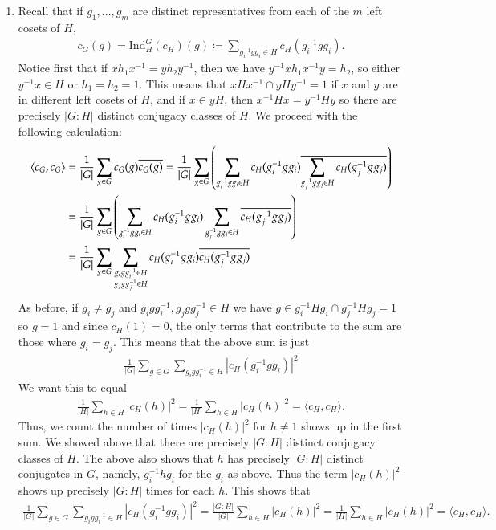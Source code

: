 \documentclass[12pt]{article}
\theoremstyle{definitionstyle}
\renewcommand{\ip}[1]{\langle#1\rangle}
\newcommand{\Ind}{\mathrm{Ind}}
\begin{document}
\begin{enumerate}
        \item Recall that if $g_1, \ldots, g_m$ are distinct representatives from each of the $m$ left cosets of $H$, 
        \begin{align*}
            c_G(g) = \Ind_H^G(c_H)(g) \coloneqq \sum_{g_i^{-1}gg_i \in H} c_H(g_i^{-1}gg_i).
        \end{align*} Notice first that if $xh_1x^{-1} = yh_2y^{-1}$, then we have $y^{-1}xh_1x^{-1}y = h_2$, so either $y^{-1}x \in H$ or $h_1 = h_2 = 1$. This means that $xHx^{-1} \cap yHy^{-1} = 1$ if $x$ and $y$ are in different left cosets of $H$, and if $x \in yH$, then $x^{-1}Hx = y^{-1}Hy$ so there are precisely $|G : H|$ distinct conjugacy classes of $H$. We proceed with the following calculation:
        \begin{align*}
            \ip{c_G, c_G} &= \frac{1}{|G|} \sum_{g \in G} c_G(g) \overline{c_G(g)} = \frac{1}{|G|} \sum_{g \in G} \qty(\sum_{g_i^{-1}gg_i \in H} c_H(g_i^{-1}gg_i) \overline{\sum_{g_j^{-1}gg_j \in H} c_H(g_j^{-1}gg_j)}) \\
            &= \frac{1}{|G|} \sum_{g \in G} \qty(\sum_{g_i^{-1}gg_i \in H} c_H(g_i^{-1}gg_i) \sum_{g_j^{-1}gg_j \in H} \overline{c_H(g_j^{-1}gg_j)}) \\
            &= \frac{1}{|G|} \sum_{g \in G} \sum_{\substack{g_igg_i^{-1} \in H \\ g_jgg_j^{-1} \in H}} c_H(g_i^{-1}gg_i) \overline{c_H(g_j^{-1}gg_j)} \\
        \end{align*}
        As before, if $g_i \neq g_j$ and $g_igg_i^{-1}, g_jgg_j^{-1} \in H$ we have $g \in g_i^{-1}Hg_i \cap g_j^{-1}Hg_j = 1$ so $g = 1$ and since $c_H(1) = 0$, the only terms that contribute to the sum are those where $g_i = g_j$. This means that the above sum is just
        \begin{align*}
            \frac{1}{|G|} \sum_{g \in G} \sum_{g_igg_i^{-1} \in H} |c_H(g_i^{-1}gg_i)|^2
        \end{align*}
        We want this to equal 
        \begin{align*}
            \frac{1}{|H|} \sum_{h \in H} |c_H(h)|^2 = \frac{1}{|H|} \sum_{h \in H} |c_H(h)|^2 = \ip{c_H, c_H}.
        \end{align*}
        Thus, we count the number of times $|c_H(h)|^2$ for $h \neq 1$ shows up in the first sum. We showed above that there are precisely $|G : H|$ distinct conjugacy classes of $H$. The above also shows that $h$ has precisely $|G : H|$ distinct conjugates in $G$, namely, $g_i^{-1}hg_i$ for the $g_i$ as above. Thus the term $|c_H(h)|^2$ shows up precisely $|G : H|$ times for each $h$. This shows that
        \begin{align*}
            \frac{1}{|G|} \sum_{g \in G} \sum_{g_igg_i^{-1} \in H} |c_H(g_i^{-1}gg_i)|^2 = \frac{|G : H|}{|G|} \sum_{h \in H} |c_H(h)|^2 = \frac{1}{|H|} \sum_{h \in H} |c_H(h)|^2 = \ip{c_H, c_H}.
        \end{align*}


\end{enumerate}
\end{document}
